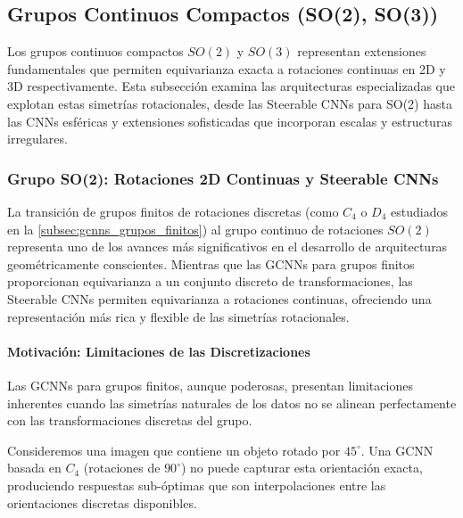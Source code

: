 \subsection{Grupos Continuos Compactos (SO(2), SO(3))}\label{subsec:grupos_continuos_compactos}

Los grupos continuos compactos $SO(2)$ y $SO(3)$ representan extensiones fundamentales que permiten equivarianza exacta a rotaciones continuas en 2D y 3D respectivamente. Esta subsección examina las arquitecturas especializadas que explotan estas simetrías rotacionales, desde las Steerable CNNs para SO(2) hasta las CNNs esféricas y extensiones sofisticadas que incorporan escalas y estructuras irregulares.

\subsubsection{Grupo SO(2): Rotaciones 2D Continuas y Steerable CNNs}\label{subsubsec:steerable_cnns_so2}

La transición de grupos finitos de rotaciones discretas (como $C_4$ o $D_4$ estudiados en la \autoref{subsec:gcnns_grupos_finitos}) al grupo continuo de rotaciones $SO(2)$ representa uno de los avances más significativos en el desarrollo de arquitecturas geométricamente conscientes. Mientras que las \glspl{GCNN} para grupos finitos proporcionan equivarianza a un conjunto discreto de transformaciones, las Steerable CNNs permiten equivarianza a rotaciones continuas, ofreciendo una representación más rica y flexible de las simetrías rotacionales.

\paragraph{Motivación: Limitaciones de las Discretizaciones}

Las \glspl{GCNN} para grupos finitos, aunque poderosas, presentan limitaciones inherentes cuando las simetrías naturales de los datos no se alinean perfectamente con las transformaciones discretas del grupo.

\begin{example}
Consideremos una imagen que contiene un objeto rotado por $45^{\circ}$. Una \gls{GCNN} basada en $C_4$ (rotaciones de $90^{\circ}$) no puede capturar esta orientación exacta, produciendo respuestas sub-óptimas que son interpolaciones entre las orientaciones discretas disponibles.
\end{example}

